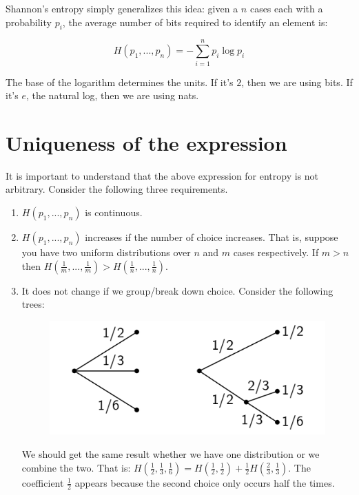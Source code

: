 \documentclass[aps,pra,10pt,floatfix,nofootinbib]{revtex4-1}
\theoremstyle{definition}
\begin{document}
Shannon's entropy simply generalizes this idea: given a $n$ cases each with a probability $p_i$, the average number of bits required to identify an element is:

\begin{equation}
\label{ShannonEntropy}
H(p_1, ..., p_n) = - \sum_{i=1}^{n} p_i \log p_i
\end{equation}

The base of the logarithm determines the units. If it's $2$, then we are using bits. If it's $e$, the natural log, then we are using nats.

\section{Uniqueness of the expression}

It is important to understand that the above expression for entropy is not arbitrary. Consider the following three requirements.

\begin{enumerate}
	\item $H(p_1, ..., p_n)$ is continuous.
	\item $H(p_1, ..., p_n)$ increases if the number of choice increases. That is, suppose you have two uniform distributions over $n$ and $m$ cases respectively. If $m>n$ then $H(\frac{1}{m}, ..., \frac{1}{m})>H(\frac{1}{n}, ..., \frac{1}{n})$.
	\item It does not change if we group/break down choice. Consider the following trees:
	\begin{figure}[h]
	\includegraphics[scale=0.70]{ShannonTree}
	\centering
	\end{figure}
	
	We should get the same result whether we have one distribution or we combine the two. That is: $H(\frac{1}{2}, \frac{1}{3}, \frac{1}{6}) = H(\frac{1}{2},\frac{1}{2}) + \frac{1}{2} H(\frac{2}{3}, \frac{1}{3})$. The coefficient $\frac{1}{2}$ appears because the second choice only occurs half the times.
\end{enumerate}
\end{document}
